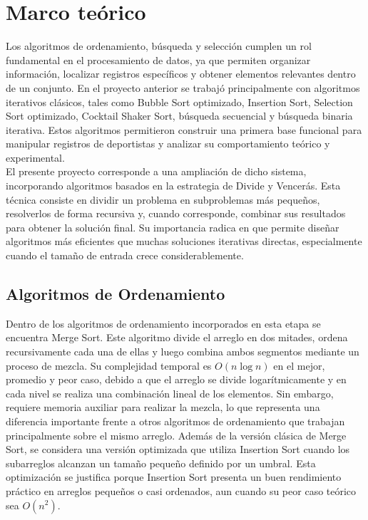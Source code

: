 \chapter{Marco teórico}

Los algoritmos de ordenamiento, búsqueda y selección cumplen un rol fundamental en el procesamiento de datos, ya que permiten organizar información, localizar registros específicos y obtener elementos relevantes dentro de un conjunto. En el proyecto anterior se trabajó principalmente con algoritmos iterativos clásicos, tales como Bubble Sort optimizado, Insertion Sort, Selection Sort optimizado, Cocktail Shaker Sort, búsqueda secuencial y búsqueda binaria iterativa. Estos algoritmos permitieron construir una primera base funcional para manipular registros de deportistas y analizar su comportamiento teórico y experimental. \\

El presente proyecto corresponde a una ampliación de dicho sistema, incorporando algoritmos basados en la estrategia de Divide y Vencerás. Esta técnica consiste en dividir un problema en subproblemas más pequeños, resolverlos de forma recursiva y, cuando corresponde, combinar sus resultados para obtener la solución final. Su importancia radica en que permite diseñar algoritmos más eficientes que muchas soluciones iterativas directas, especialmente cuando el tamaño de entrada crece considerablemente. \\

\section{Algoritmos de Ordenamiento}

Dentro de los algoritmos de ordenamiento incorporados en esta etapa se encuentra Merge Sort. Este algoritmo divide el arreglo en dos mitades, ordena recursivamente cada una de ellas y luego combina ambos segmentos mediante un proceso de mezcla. Su complejidad temporal es $O(n \log n)$ en el mejor, promedio y peor caso, debido a que el arreglo se divide logarítmicamente y en cada nivel se realiza una combinación lineal de los elementos. Sin embargo, requiere memoria auxiliar para realizar la mezcla, lo que representa una diferencia importante frente a otros algoritmos de ordenamiento que trabajan principalmente sobre el mismo arreglo. Además de la versión clásica de Merge Sort, se considera una versión optimizada que utiliza Insertion Sort cuando los subarreglos alcanzan un tamaño pequeño definido por un umbral. Esta optimización se justifica porque Insertion Sort presenta un buen rendimiento práctico en arreglos pequeños o casi ordenados, aun cuando su peor caso teórico sea $O(n^2)$. \\

